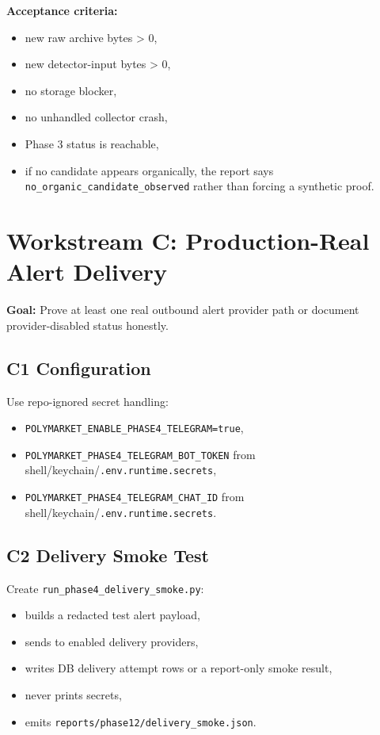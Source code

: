 \documentclass{article}
\begin{document}
\textbf{Acceptance criteria:}
\begin{itemize}[nosep]
\item new raw archive bytes > 0,
\item new detector-input bytes > 0,
\item no storage blocker,
\item no unhandled collector crash,
\item Phase 3 status is reachable,
\item if no candidate appears organically, the report says \texttt{no\_organic\_candidate\_observed} rather than forcing a synthetic proof.
\end{itemize}

\section*{Workstream C: Production-Real Alert Delivery}
\textbf{Goal:} Prove at least one real outbound alert provider path or document provider-disabled status honestly.

\subsection*{C1 Configuration}
Use repo-ignored secret handling:
\begin{itemize}[nosep]
\item \texttt{POLYMARKET\_ENABLE\_PHASE4\_TELEGRAM=true},
\item \texttt{POLYMARKET\_PHASE4\_TELEGRAM\_BOT\_TOKEN} from shell/keychain/\texttt{.env.runtime.secrets},
\item \texttt{POLYMARKET\_PHASE4\_TELEGRAM\_CHAT\_ID} from shell/keychain/\texttt{.env.runtime.secrets}.
\end{itemize}

\subsection*{C2 Delivery Smoke Test}
Create \texttt{run\_phase4\_delivery\_smoke.py}:
\begin{itemize}[nosep]
\item builds a redacted test alert payload,
\item sends to enabled delivery providers,
\item writes DB delivery attempt rows or a report-only smoke result,
\item never prints secrets,
\item emits \texttt{reports/phase12/delivery\_smoke.json}.
\end{itemize}
\end{document}
